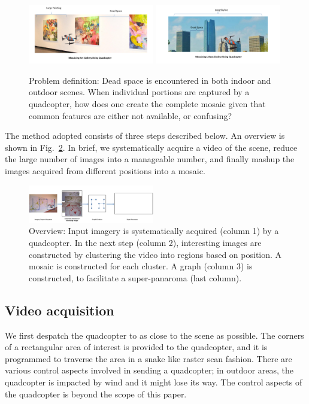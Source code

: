 \documentclass[10pt,twocolumn,letterpaper]{article}
\begin{document}
\begin{figure}[h!]
  \centering
  \includegraphics[width=0.49\textwidth]{figures/indoor} 
  \includegraphics[width=0.49\textwidth]{figures/outdoor}
  \caption{ \label{fig:schematic} Problem definition: Dead space is
    encountered in both indoor and outdoor scenes.  When individual
    portions are captured by a quadcopter, how does one create the
    complete mosaic given that common features are either not
    available, or confusing?
  }
\end{figure}    


The method adopted consists of three steps described below. An
overview is shown in Fig.~\ref{fig:workflow}.  In brief, we
systematically acquire a video of the scene, reduce the large number
of images into a manageable number, and finally mashup the images
acquired from different positions into a mosaic.

\begin{figure}[b!]
  \centering
  \includegraphics[width=0.49\textwidth]{figures/Workflow} 
  \caption{ \label{fig:workflow} Overview: Input imagery is
    systematically acquired (column 1) by a quadcopter.  In the next
    step (column 2), interesting images are constructed by clustering
    the video into regions based on position. A mosaic is constructed
    for each cluster.  A graph (column 3) is constructed, to
    facilitate a super-panaroma (last column).  }
\end{figure}    


\subsection{Video acquisition}
We first despatch the quadcopter to as close to the scene as
possible. The corners of a rectangular area of interest is provided to
the quadcopter, and it is programmed to traverse the area in a snake
like raster scan fashion.  There are various control aspects involved
in sending a quadcopter; in outdoor areas, the quadcopter is impacted
by wind and it might lose its way.  The control aspects of the
quadcopter is beyond the scope of this paper.
\end{document}
